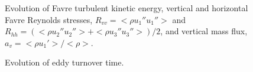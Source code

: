 \documentclass[11pt]{article}
\begin{document}
\begin{figure}[h]
\caption{Evolution of Favre turbulent kinetic energy, vertical and horizontal 
Favre Reynolds stresses, $R_{vv}= <\rho u_1'' u_1''>$ and 
$R_{hh}= (<\rho u_2'' u_2''>+<\rho u_3'' u_3''>)/2$, and vertical mass 
flux, $a_v = <\rho u_1'>/<\rho>$.}
\label{figure2}
\end{figure}

\begin{figure}[h]
\caption{Evolution of eddy turnover time.}
\label{figure3}
\end{figure}
\end{document}
